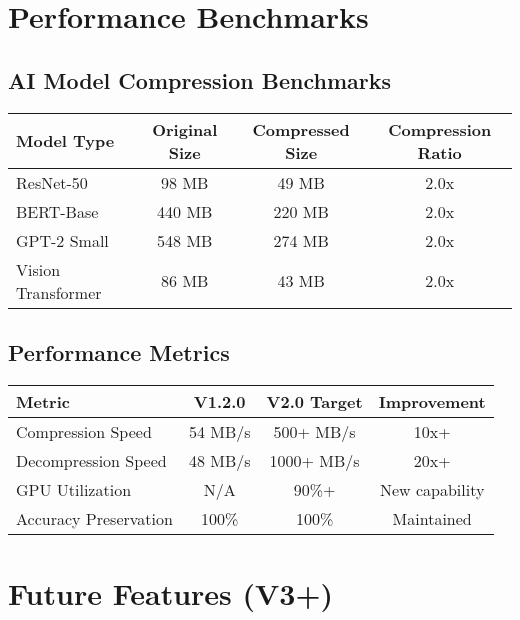 \documentclass[12pt,a4paper]{article}
\begin{document}
\section{Performance Benchmarks}

\subsection{AI Model Compression Benchmarks}
\begin{center}
\begin{tabular}{|l|c|c|c|}
\hline
\textbf{Model Type} & \textbf{Original Size} & \textbf{Compressed Size} & \textbf{Compression Ratio} \\
\hline
ResNet-50 & 98 MB & 49 MB & 2.0x \\
BERT-Base & 440 MB & 220 MB & 2.0x \\
GPT-2 Small & 548 MB & 274 MB & 2.0x \\
Vision Transformer & 86 MB & 43 MB & 2.0x \\
\hline
\end{tabular}
\end{center}

\subsection{Performance Metrics}
\begin{center}
\begin{tabular}{|l|c|c|c|}
\hline
\textbf{Metric} & \textbf{V1.2.0} & \textbf{V2.0 Target} & \textbf{Improvement} \\
\hline
Compression Speed & 54 MB/s & 500+ MB/s & 10x+ \\
Decompression Speed & 48 MB/s & 1000+ MB/s & 20x+ \\
GPU Utilization & N/A & 90\%+ & New capability \\
Accuracy Preservation & 100\% & 100\% & Maintained \\
\hline
\end{tabular}
\end{center}

\section{Future Features (V3+)}
\end{document}
